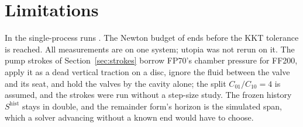 \documentclass[sigconf,nonacm]{acmart}
\begin{document}
\begin{table}
\caption{FF200 through \trStrokes{} strokes on one GPU per storage of the history and of the stress
slots: the Prony state (MB) and the median $e_u$ (\%) against the first run in double, the history
stored as itself ($H$) and with the slow terms as remainders ($G$, the MB). The first row repeats
that run. a.+d.: average and deviation, over runs of 16 elements on TET4.}
\label{tab:prony-valves}
\small

\end{table}

\begin{table}
\caption{A step's two passes over the history (\si{\micro\second}, the frozen history and the update)
per format, with the remainder form: the valves' series at $\Delta t=\SI{0.1}{\milli\second}$, four
stored terms, two of them remainders, on a synthetic smooth stress
(drivers/bench/bench\_prony\_history), per points per element and elements.}
\label{tab:prony-cost}
\small

\end{table}

\section{Limitations}

In the single-process runs \qpCappedClause{}. The Newton budget
of \unconvergedCases{} ends before the KKT tolerance is reached. All measurements are on one system; utopia was not rerun on it.
The pump strokes of Section~\ref{sec:strokes} borrow FP70's chamber pressure for FF200, apply it as
a dead vertical traction on a disc, ignore the fluid between the valve and its seat, and hold the
valves by the cavity alone; the split $C_{01}/C_{10}=4$ is assumed, and the strokes were run
without a step-size study.
The frozen history $S^{\mathrm{hist}}$ stays in double, and the remainder form's horizon is the
simulated span, which a solver advancing without a known end would have to choose.



\end{document}
